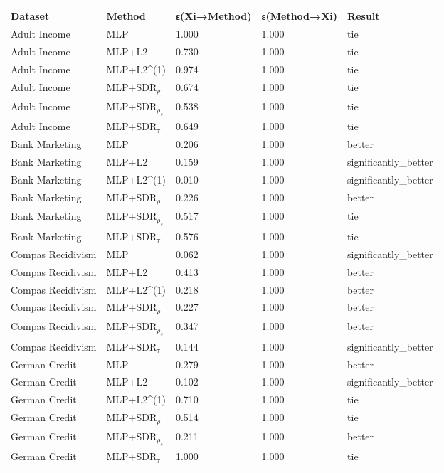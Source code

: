 \begin{tabular}{lllll}
\toprule
Dataset & Method & ε(Xi→Method) & ε(Method→Xi) & Result \\
\midrule
Adult Income & MLP & 1.000 & 1.000 & tie \\
Adult Income & MLP+L2 & 0.730 & 1.000 & tie \\
Adult Income & MLP+L2^{(1)} & 0.974 & 1.000 & tie \\
Adult Income & MLP+SDR$_{\rho}$ & 0.674 & 1.000 & tie \\
Adult Income & MLP+SDR$_{\rho_s}$ & 0.538 & 1.000 & tie \\
Adult Income & MLP+SDR$_{\tau}$ & 0.649 & 1.000 & tie \\
Bank Marketing & MLP & 0.206 & 1.000 & better \\
Bank Marketing & MLP+L2 & 0.159 & 1.000 & significantly_better \\
Bank Marketing & MLP+L2^{(1)} & 0.010 & 1.000 & significantly_better \\
Bank Marketing & MLP+SDR$_{\rho}$ & 0.226 & 1.000 & better \\
Bank Marketing & MLP+SDR$_{\rho_s}$ & 0.517 & 1.000 & tie \\
Bank Marketing & MLP+SDR$_{\tau}$ & 0.576 & 1.000 & tie \\
Compas Recidivism & MLP & 0.062 & 1.000 & significantly_better \\
Compas Recidivism & MLP+L2 & 0.413 & 1.000 & better \\
Compas Recidivism & MLP+L2^{(1)} & 0.218 & 1.000 & better \\
Compas Recidivism & MLP+SDR$_{\rho}$ & 0.227 & 1.000 & better \\
Compas Recidivism & MLP+SDR$_{\rho_s}$ & 0.347 & 1.000 & better \\
Compas Recidivism & MLP+SDR$_{\tau}$ & 0.144 & 1.000 & significantly_better \\
German Credit & MLP & 0.279 & 1.000 & better \\
German Credit & MLP+L2 & 0.102 & 1.000 & significantly_better \\
German Credit & MLP+L2^{(1)} & 0.710 & 1.000 & tie \\
German Credit & MLP+SDR$_{\rho}$ & 0.514 & 1.000 & tie \\
German Credit & MLP+SDR$_{\rho_s}$ & 0.211 & 1.000 & better \\
German Credit & MLP+SDR$_{\tau}$ & 1.000 & 1.000 & tie \\
\bottomrule
\end{tabular}
